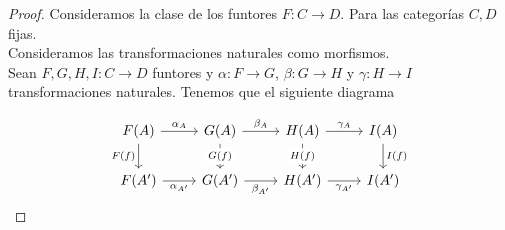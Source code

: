 \documentclass[12pt,letterpaper,titlepage]{article}
\theoremstyle{definition}
\newcommand\<{\langle}
\renewcommand\>{\rangle}
\begin{document}
\begin{proof}
  Consideramos la clase de los funtores $F\colon C\to D$. Para las categorías $C,D$ fijas.\\
Consideramos las transformaciones naturales como morfismos.\\
Sean $F,G,H,I:C\to D$ funtores y $\alpha\colon F\to G$, $\beta\colon G\to H$ y $\gamma\colon H\to I$ transformaciones naturales. Tenemos que el siguiente diagrama

\[
\begin{tikzcd}
F(A) \arrow[d, "F(f)"'] \arrow[r, "\alpha_A"] & G(A) \arrow[d, "G(f)" description] \arrow[r, "\beta_A"] & H(A) \arrow[d, "H(f)" description] \arrow[r, "\gamma_A"] & I(A) \arrow[d, "I(f)"] \\
F(A') \arrow[r, "\alpha_{A'}"']               & G(A') \arrow[r, "\beta_{A'}"']                          & H(A') \arrow[r, "\gamma_{A'}"']                          & I(A')                 
\end{tikzcd}
\]


\end{proof}
\end{document}
